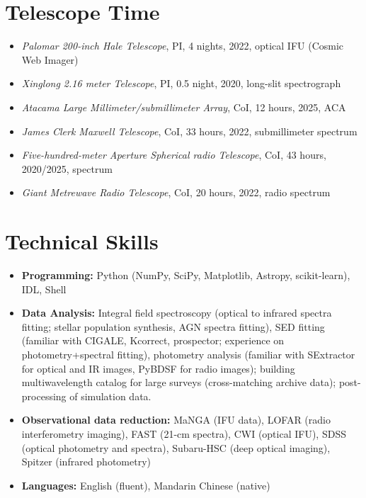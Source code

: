 \documentclass[12pt,a4paper]{article}
\begin{document}
\section*{Telescope Time}

\begin{itemize}[leftmargin=*, itemsep=2pt]
  \item \textit{Palomar 200-inch Hale Telescope}, PI, 4 nights, 2022, optical IFU (Cosmic Web Imager)
  \item \textit{Xinglong 2.16 meter Telescope}, PI, 0.5 night, 2020, long-slit spectrograph
  \item \textit{Atacama Large Millimeter/submillimeter Array}, CoI, 12 hours, 2025, ACA
  \item \textit{James Clerk Maxwell Telescope}, CoI, 33 hours, 2022, submillimeter spectrum
  \item \textit{Five-hundred-meter Aperture Spherical radio Telescope}, CoI, 43 hours, 2020/2025, spectrum
  \item \textit{Giant Metrewave Radio Telescope}, CoI, 20 hours, 2022, radio spectrum
\end{itemize}

\section*{Technical Skills}

\begin{itemize}[leftmargin=*, itemsep=2pt]
  \item\textbf{Programming:} Python (NumPy, SciPy, Matplotlib, Astropy, scikit-learn), IDL, Shell
  \item \textbf{Data Analysis:} Integral field spectroscopy (optical to infrared spectra fitting; stellar population synthesis, AGN spectra fitting), SED fitting (familiar with CIGALE, Kcorrect, prospector; experience on photometry+spectral fitting), photometry analysis (familiar with SExtractor for optical and IR images, PyBDSF for radio images); building multiwavelength catalog for large surveys (cross-matching archive data); post-processing of simulation data.
  \item \textbf{Observational data reduction:} MaNGA (IFU data), LOFAR (radio interferometry imaging), FAST (21-cm spectra), CWI (optical IFU),
  SDSS (optical photometry and spectra), Subaru-HSC (deep optical imaging), Spitzer (infrared photometry) 
  \item \textbf{Languages:} English (fluent), Mandarin Chinese (native)
\end{itemize}
\end{document}
